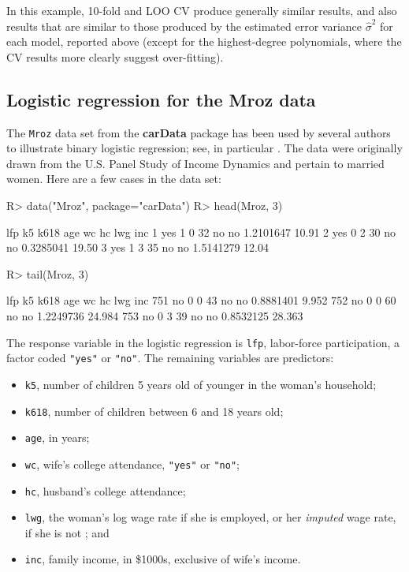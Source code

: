 \documentclass[
]{jss}
\providecommand{\tightlist}{%
  \setlength{\itemsep}{0pt}\setlength{\parskip}{0pt}}
\begin{document}
In this example, 10-fold and LOO CV produce generally similar results,
and also results that are similar to those produced by the estimated
error variance \(\widehat{\sigma}^2\) for each model, reported above
(except for the highest-degree polynomials, where the CV results more
clearly suggest over-fitting).

\hypertarget{logistic-regression-for-the-mroz-data}{%
\subsection{Logistic regression for the Mroz
data}\label{logistic-regression-for-the-mroz-data}}

The \texttt{Mroz} data set from the \textbf{carData} package
\citep[associated with][]{FoxWeisberg:2019} has been used by several
authors to illustrate binary logistic regression; see, in particular
\citet{FoxWeisberg:2019}. The data were originally drawn from the U.S.
Panel Study of Income Dynamics and pertain to married women. Here are a
few cases in the data set:

\begin{CodeChunk}
\begin{CodeInput}
R> data("Mroz", package="carData")
R> head(Mroz, 3)
\end{CodeInput}
\begin{CodeOutput}
  lfp k5 k618 age wc hc       lwg   inc
1 yes  1    0  32 no no 1.2101647 10.91
2 yes  0    2  30 no no 0.3285041 19.50
3 yes  1    3  35 no no 1.5141279 12.04
\end{CodeOutput}
\begin{CodeInput}
R> tail(Mroz, 3)
\end{CodeInput}
\begin{CodeOutput}
    lfp k5 k618 age wc hc       lwg    inc
751  no  0    0  43 no no 0.8881401  9.952
752  no  0    0  60 no no 1.2249736 24.984
753  no  0    3  39 no no 0.8532125 28.363
\end{CodeOutput}
\end{CodeChunk}

The response variable in the logistic regression is \texttt{lfp},
labor-force participation, a factor coded \texttt{"yes"} or
\texttt{"no"}. The remaining variables are predictors:

\begin{itemize}
\tightlist
\item
  \texttt{k5}, number of children 5 years old of younger in the woman's
  household;
\item
  \texttt{k618}, number of children between 6 and 18 years old;
\item
  \texttt{age}, in years;
\item
  \texttt{wc}, wife's college attendance, \texttt{"yes"} or
  \texttt{"no"};
\item
  \texttt{hc}, husband's college attendance;
\item
  \texttt{lwg}, the woman's log wage rate if she is employed, or her
  \emph{imputed} wage rate, if she is not \citep[a variable that][ show
  is problematically defined]{FoxWeisberg:2019}; and
\item
  \texttt{inc}, family income, in \$1000s, exclusive of wife's income.
\end{itemize}
\end{document}
